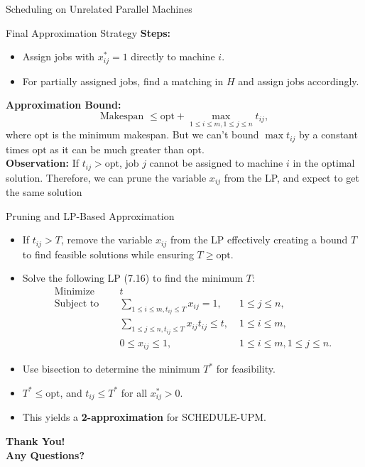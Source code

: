 \documentclass[xcolor=svgnames]{beamer}
\begin{document}
\begin{section}{Scheduling on Unrelated Parallel Machines}
\begin{frame}{Final Approximation Strategy}
\textbf{Steps:}
\begin{itemize}
    \item Assign jobs with \(x_{ij}^* = 1\) directly to machine \(i\).
    \item For partially assigned jobs, find a matching in \(H\) and assign jobs accordingly.
\end{itemize}
\pause
\textbf{Approximation Bound:}
    \[
        \text{Makespan } \leq \text{opt} + \max_{1 \leq i \leq m, 1 \leq j \leq n} t_{ij},
    \]
    where $\text{opt}$ is the minimum makespan. But we can't bound $\max t_{ij}$ by a constant times $\text{opt}$ as it can be much greater than opt.\\
    \pause
    \vspace{5pt}
    \textbf{Observation:} If $t_{ij} > \text{opt}$, job $j$ cannot be assigned to machine $i$ in the optimal solution. Therefore, we can prune the variable $x_{ij}$ from the LP, and expect to get the same solution
\end{frame}
\begin{frame}{Pruning and LP-Based Approximation}
    \begin{itemize}[<+->]
        \item If $t_{ij} > T$, remove the variable $x_{ij}$ from the LP effectively creating a bound $T$ to find feasible solutions while ensuring $T \geq \text{opt}$.
        \item Solve the following LP (7.16) to find the minimum $T$:
        \[
            \begin{aligned}
                \text{Minimize } & \; \quad t \\
                \text{Subject to} & \; \quad \sum_{1 \leq i \leq m, t_{ij} \leq T} x_{ij} = 1, &\; 1\leq j \leq n, \\
                & \; \quad  \sum_{1 \leq j \leq n, t_{ij} \leq T} x_{ij} t_{ij} \leq t,& \; 1\leq i \leq m, \\
                & \; \quad  0\leq x_{ij} \leq 1, &\; 1\leq i \leq m,  1\leq j \leq n.
            \end{aligned}
            \]
        \item Use bisection to determine the minimum $T^*$ for feasibility.
        \item $T^* \leq \text{opt}$, and $t_{ij} \leq T^*$ for all $x^*_{ij} > 0$.
        \item This yields a \textbf{2-approximation} for SCHEDULE-UPM.
    \end{itemize}
\end{frame}

\end{section}
\begin{frame}[plain]
    \centering
    \vspace{2cm}
    {\Huge \textbf{Thank You!}} \\
    \vspace{1cm}
    {\Large \textbf{Any Questions?}}
\end{frame}
\end{document}
